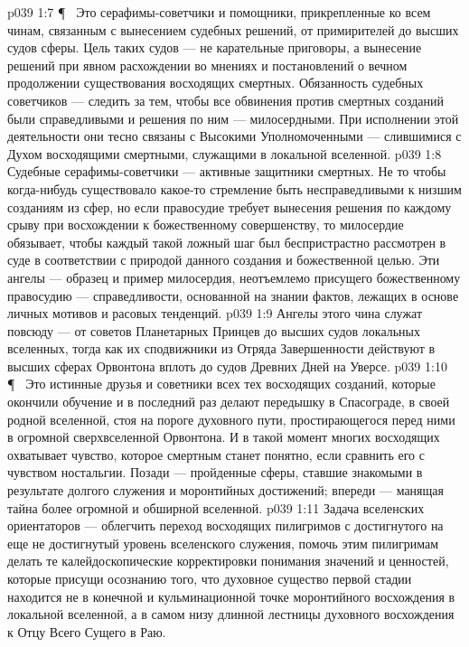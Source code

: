 \vs p039 1:7 \P\ \bibnobreakspace {} Это серафимы\hyp{}советчики и помощники, прикрепленные ко всем чинам, связанным с вынесением судебных решений, от примирителей до высших судов сферы. Цель таких судов --- не карательные приговоры, а вынесение решений при явном расхождении во мнениях и постановлений о вечном продолжении существования восходящих смертных. Обязанность судебных советчиков --- следить за тем, чтобы все обвинения против смертных созданий были справедливыми и решения по ним --- милосердными. При исполнении этой деятельности они тесно связаны с Высокими Уполномоченными --- слившимися с Духом восходящими смертными, служащими в локальной вселенной.
\vs p039 1:8 Судебные серафимы\hyp{}советчики --- активные защитники смертных. Не то чтобы когда\hyp{}нибудь существовало какое\hyp{}то стремление быть несправедливыми к низшим созданиям из сфер, но если правосудие требует вынесения решения по каждому срыву при восхождении к божественному совершенству, то милосердие обязывает, чтобы каждый такой ложный шаг был беспристрастно рассмотрен в суде в соответствии с природой данного создания и божественной целью. Эти ангелы --- образец и пример милосердия, неотъемлемо присущего божественному правосудию --- справедливости, основанной на знании фактов, лежащих в основе личных мотивов и расовых тенденций.
\vs p039 1:9 Ангелы этого чина служат повсюду --- от советов Планетарных Принцев до высших судов локальных вселенных, тогда как их сподвижники из Отряда Завершенности действуют в высших сферах Орвонтона вплоть до судов Древних Дней на Уверсе.
\vs p039 1:10 \P\ \bibnobreakspace {} Это истинные друзья и советники всех тех восходящих созданий, которые окончили обучение и в последний раз делают передышку в Спасограде, в своей родной вселенной, стоя на пороге духовного пути, простирающегося перед ними в огромной сверхвселенной Орвонтона. И в такой момент многих восходящих охватывает чувство, которое смертным станет понятно, если сравнить его с чувством ностальгии. Позади --- пройденные сферы, ставшие знакомыми в результате долгого служения и моронтийных достижений; впереди --- манящая тайна более огромной и обширной вселенной.
\vs p039 1:11 Задача вселенских ориентаторов --- облегчить переход восходящих пилигримов с достигнутого на еще не достигнутый уровень вселенского служения, помочь этим пилигримам делать те калейдоскопические корректировки понимания значений и ценностей, которые присущи осознанию того, что духовное существо первой стадии находится не в конечной и кульминационной точке моронтийного восхождения в локальной вселенной, а в самом низу длинной лестницы духовного восхождения к Отцу Всего Сущего в Раю.
